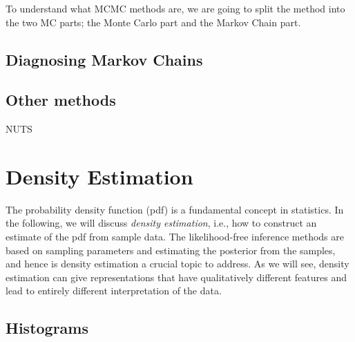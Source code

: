 To understand what MCMC methods are, we are going to split the method into the two MC parts; the Monte Carlo part and the Markov Chain part.

\subsection{Diagnosing Markov Chains}


\subsection{Other methods}

NUTS

\section{Density Estimation}\label{sec:dens_est}

The probability density function (pdf) is a fundamental concept in statistics. In the following, we will discuss \textit{density estimation}, i.e., how to construct an estimate of the pdf from sample data. The likelihood-free inference methods are based on sampling parameters and estimating the posterior from the samples, and hence is density estimation a crucial topic to address. As we will see, density estimation can give representations that have qualitatively different features and lead to entirely different interpretation of the data. 

\subsection{Histograms}\label{sec:histograms}

